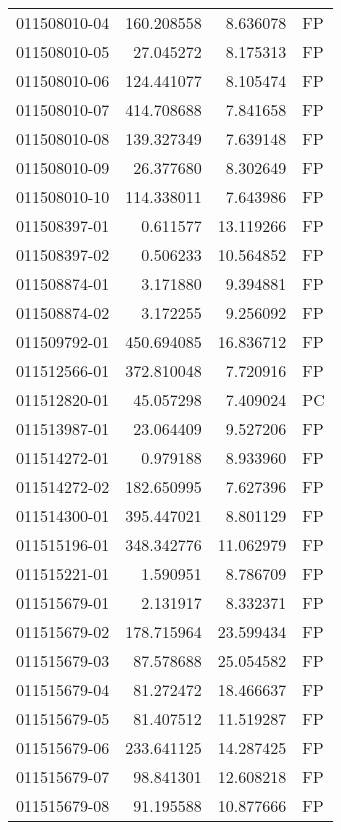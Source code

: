 \begin{tabular}{lrrl}
011508010-04 &  160.208558 &       8.636078 &   FP \\
011508010-05 &   27.045272 &       8.175313 &   FP \\
011508010-06 &  124.441077 &       8.105474 &   FP \\
011508010-07 &  414.708688 &       7.841658 &   FP \\
011508010-08 &  139.327349 &       7.639148 &   FP \\
011508010-09 &   26.377680 &       8.302649 &   FP \\
011508010-10 &  114.338011 &       7.643986 &   FP \\
011508397-01 &    0.611577 &      13.119266 &   FP \\
011508397-02 &    0.506233 &      10.564852 &   FP \\
011508874-01 &    3.171880 &       9.394881 &   FP \\
011508874-02 &    3.172255 &       9.256092 &   FP \\
011509792-01 &  450.694085 &      16.836712 &   FP \\
011512566-01 &  372.810048 &       7.720916 &   FP \\
011512820-01 &   45.057298 &       7.409024 &   PC \\
011513987-01 &   23.064409 &       9.527206 &   FP \\
011514272-01 &    0.979188 &       8.933960 &   FP \\
011514272-02 &  182.650995 &       7.627396 &   FP \\
011514300-01 &  395.447021 &       8.801129 &   FP \\
011515196-01 &  348.342776 &      11.062979 &   FP \\
011515221-01 &    1.590951 &       8.786709 &   FP \\
011515679-01 &    2.131917 &       8.332371 &   FP \\
011515679-02 &  178.715964 &      23.599434 &   FP \\
011515679-03 &   87.578688 &      25.054582 &   FP \\
011515679-04 &   81.272472 &      18.466637 &   FP \\
011515679-05 &   81.407512 &      11.519287 &   FP \\
011515679-06 &  233.641125 &      14.287425 &   FP \\
011515679-07 &   98.841301 &      12.608218 &   FP \\
011515679-08 &   91.195588 &      10.877666 &   FP \\

\end{tabular}
